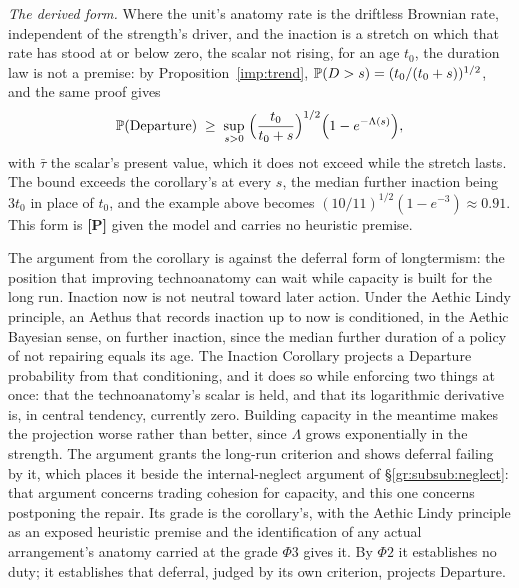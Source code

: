 \noindent\emph{The derived form.} Where the unit's anatomy rate is the
driftless Brownian rate, independent of the strength's driver, and the
inaction is a stretch on which that rate has stood at or below zero, the
scalar not rising, for an age $t_0$, the duration law is not a premise: by
Proposition~\ref{imp:trend},
$\mathbb{P}(D>s)=(t_0/(t_0+s))^{1/2}$, and the same proof gives
\[
\mathbb{P}(\text{Departure})\;\ge\;\sup_{s>0}\;\Bigl(\frac{t_0}{t_0+s}\Bigr)^{1/2}\Big(1-e^{-\Lambda(s)}\Big),
\]
with $\bar\tau$ the scalar's present value, which it does not exceed
while the stretch lasts. The bound exceeds
the corollary's at every $s$, the median further inaction being $3t_0$ in
place of $t_0$, and the example above becomes
$(10/11)^{1/2}(1-e^{-3})\approx0.91$. This form is \textbf{[P]} given the
model and carries no heuristic premise.

\begin{remark}\label{gr1:rem:antilongtermism}
The argument from the corollary is against the deferral form of
longtermism: the position that improving technoanatomy can wait while
capacity is built for the long run. Inaction now is not neutral toward
later action. Under the Aethic Lindy principle, an Aethus that records
inaction up to now is conditioned, in the Aethic Bayesian sense, on further
inaction, since the median further duration of a policy of not repairing
equals its age. The Inaction Corollary projects a Departure probability from
that conditioning, and it does so while enforcing two things at once: that
the technoanatomy's scalar is held, and that its logarithmic derivative is, in central
tendency, currently zero. Building capacity in the meantime makes the
projection worse rather than better, since $\Lambda$ grows exponentially in
the strength. The argument grants the long-run criterion and shows deferral
failing by it, which places it beside the internal-neglect argument of
\S\ref{gr:subsub:neglect}: that argument concerns trading cohesion for
capacity, and this one concerns postponing the repair. Its grade is the
corollary's, with the Aethic Lindy principle as an exposed heuristic
premise and the identification of any actual arrangement's anatomy carried
at the grade $\Phi3$ gives it. By $\Phi2$ it establishes no duty; it establishes that
deferral, judged by its own criterion, projects Departure.
\end{remark}

